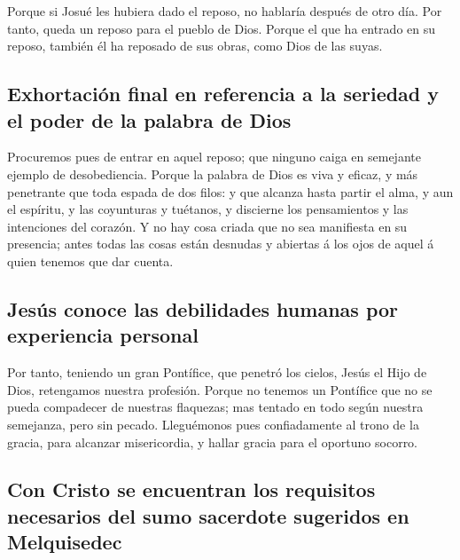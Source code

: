  Porque si Josué les hubiera dado el reposo, no hablaría
después de otro día.  Por tanto, queda un reposo para el
pueblo de Dios.  Porque el que ha entrado en su reposo,
también él ha reposado de sus obras, como Dios de las suyas.

\hypertarget{exhortaciuxf3n-final-en-referencia-a-la-seriedad-y-el-poder-de-la-palabra-de-dios}{%
\subsection{Exhortación final en referencia a la seriedad y el poder de
la palabra de
Dios}\label{exhortaciuxf3n-final-en-referencia-a-la-seriedad-y-el-poder-de-la-palabra-de-dios}}

 Procuremos pues de entrar en aquel reposo; que ninguno
caiga en semejante ejemplo de desobediencia.  Porque la
palabra de Dios es viva y eficaz, y más penetrante que toda espada de
dos filos: y que alcanza hasta partir el alma, y aun el espíritu, y las
coyunturas y tuétanos, y discierne los pensamientos y las intenciones
del corazón.  Y no hay cosa criada que no sea manifiesta
en su presencia; antes todas las cosas están desnudas y abiertas á los
ojos de aquel á quien tenemos que dar cuenta.

\hypertarget{jesuxfas-conoce-las-debilidades-humanas-por-experiencia-personal}{%
\subsection{Jesús conoce las debilidades humanas por experiencia
personal}\label{jesuxfas-conoce-las-debilidades-humanas-por-experiencia-personal}}

 Por tanto, teniendo un gran Pontífice, que penetró los
cielos, Jesús el Hijo de Dios, retengamos nuestra profesión.
 Porque no tenemos un Pontífice que no se pueda
compadecer de nuestras flaquezas; mas tentado en todo según nuestra
semejanza, pero sin pecado.  Lleguémonos pues
confiadamente al trono de la gracia, para alcanzar misericordia, y
hallar gracia para el oportuno socorro.

\hypertarget{con-cristo-se-encuentran-los-requisitos-necesarios-del-sumo-sacerdote-sugeridos-en-melquisedec}{%
\subsection{Con Cristo se encuentran los requisitos necesarios del sumo
sacerdote sugeridos en
Melquisedec}\label{con-cristo-se-encuentran-los-requisitos-necesarios-del-sumo-sacerdote-sugeridos-en-melquisedec}}

